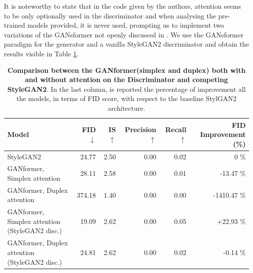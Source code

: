 \documentclass{article}
\begin{document}
    It is noteworthy to state that in the code given by the authors, attention seems to be only optionally 
    used in the discriminator and when analysing the pre-trained models provided, it is never used,
	prompting us to implement two variations of the GANsformer not openly 
    discussed in \cite{hudson2021generative}.
    We use the GANsformer paradigm for the generator and a vanilla StyleGAN2 discriminator and 
    obtain the results visible in Table \ref{tab:our-results2}.
    \begin{table}[htb]
    	\centering
        \caption{\textbf{Comparison between the GANformer(simplex and duplex) both with and without 
        attention on the Discriminator and competing StyleGAN2}.  In the last column, is reported the 
        percentage of improvement all the models, in terms of FID score, with respect to the baseline 
        StylGAN2 architecture.}
        \label{tab:our-results2}
        \vspace{3mm}
        \small
        \begin{tabular}{l|rrrrr}
	        \toprule
	        Model                        & FID $\downarrow$  & IS $\uparrow$& Precision $\uparrow$& Recall 
	        $\uparrow$& FID Improvement (\%)\\ 
	        \midrule
	        StyleGAN2                    &  24.77 & 2.50 & 0.00 & 0.02 & 0 \%\\ 
			GANformer, Simplex attention & 28.11 & 2.58 & 0.00 & 0.01 & -13.47 \%\\ 
			GANformer, Duplex attention  & 374.18 & 1.40 & 0.00 & 0.00 & -1410.47  \%\\ 
	        GANformer, Simplex attention (StyleGAN2 disc.) & 19.09 &  2.62  &  0.00    & 0.05  & 
	        +22.93 \% \\ 
	        GANformer, Duplex attention (StyleGAN2 disc.)  &  24.81  & 2.62 &   0.00   & 0.02 & 
	        -0.14 \%\\ 
	        \bottomrule
        \end{tabular}
        \end{table}
       
\end{document}
